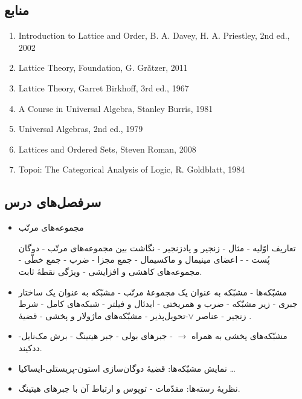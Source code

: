 \subsection*{منابع}
\begin{LTR}
\begin{enumerate}
  \item Introduction to Lattice and Order, B. A. Davey, H. A. Priestley, 2nd ed., 2002
  \item Lattice Theory, Foundation, G. Gr\~atzer, 2011
  \item Lattice Theory, Garret Birkhoff, 3rd ed., 1967
  \item A Course in Universal Algebra, Stanley Burris, 1981
  \item Universal Algebras, 2nd ed., 1979
  \item Lattices and Ordered Sets, Steven Roman, 2008
  \item Topoi: The Categorical Analysis of Logic, R. Goldblatt, 1984
\end{enumerate}
\end{LTR}

\subsection{سرفصل‌های درس}
\begin{itemize}
  \item مجموعه‌های مرتّب
  
  تعاریف اوّلیه - مثال - زنجیر و پادزنجیر - نگاشت بین مجموعه‌های مرتّب - دوگان پُست -  - اعضای مینیمال و ماکسیمال - جمع مجزا - ضرب - جمع خطّی - مجموعه‌های کاهشی و افزایشی - ویژگی نقطهٔ ثابت.
  \item مشبّکه‌ها - مشبّکه به عنوان یک مجموعهٔ مرتّب - مشبّکه به عنوان یک ساختار جبری - زیر مشبّکه - ضرب و همریختی - ایدئال و فیلتر - شبکه‌های کامل - شرط زنجیر - عناصر $\vee$-تحویل‌پذیر - مشبّکه‌های ماژولار و پخشی - قضیهٔ .
  \item مشبّکه‌های پخشی به همراه $\to$ - جبرهای بولی - جبر هیتینگ - برش مک‌نایل-ددکیند.
  \item نمایش مشبّکه‌ها: قضیهٔ دوگان‌سازی استون-پریستلی-ایساکیا \dots
  \item نظریهٔ رسته‌ها: مقدّمات - توپوس و ارتباط آن با جبرهای هیتینگ.
\end{itemize}

